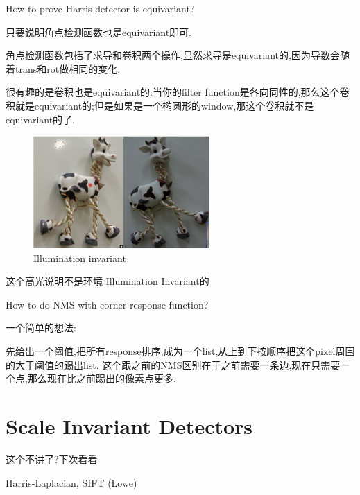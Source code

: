 \begin{problem}
    How to prove Harris detector is equivariant?
\end{problem}


只要说明角点检测函数也是equivariant即可.

角点检测函数包括了求导和卷积两个操作,显然求导是equivariant的,因为导数会随着trans和rot做相同的变化.

很有趣的是卷积也是equivariant的:当你的filter function是各向同性的,那么这个卷积就是equivariant的;但是如果是一个椭圆形的window,那这个卷积就不是equivariant的了.

\begin{figure}[htbp]
    \centering
    \includegraphics[width=0.6\textwidth]{figures/light_invariant.png}
    \caption{Illumination invariant}
\end{figure}
\begin{remark}
    这个高光说明不是环境 Illumination Invariant的
\end{remark}


\begin{problem}
    How to do NMS with corner-response-function?
\end{problem}


一个简单的想法:

先给出一个阈值,把所有response排序,成为一个list,从上到下按顺序把这个pixel周围的大于阈值的踢出list.
这个跟之前的NMS区别在于之前需要一条边,现在只需要一个点,那么现在比之前踢出的像素点更多.

\section{Scale Invariant Detectors}

这个不讲了?下次看看

Harris-Laplacian, SIFT (Lowe)